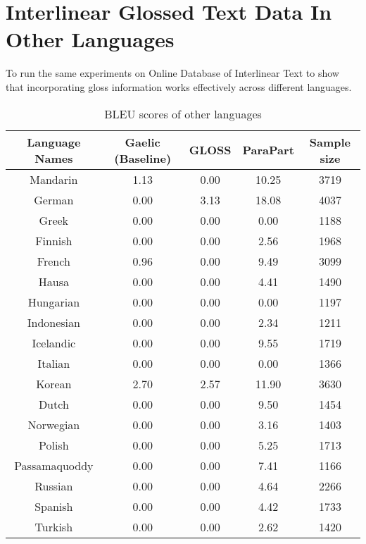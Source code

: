 \chapter{Interlinear Glossed Text Data In Other Languages}
\label{chap:gloss_in_other_languages}

To run the same experiments on Online Database of Interlinear Text \citep{ODIN, Xia2016} to show that incorporating gloss information works effectively across different languages.  

\begin{table}[ht]
\centering
\begin{tabular}{ccccc}
  \hline
Language Names & Gaelic (Baseline) & GLOSS & ParaPart & Sample size \\ 
  \hline
Mandarin & 1.13 & 0.00 & 10.25 & 3719 \\ 
  German & 0.00 & 3.13 & 18.08 & 4037 \\ 
  Greek & 0.00 & 0.00 & 0.00 & 1188 \\ 
  Finnish & 0.00 & 0.00 & 2.56 & 1968 \\ 
  French & 0.96 & 0.00 & 9.49 & 3099 \\ 
  Hausa & 0.00 & 0.00 & 4.41 & 1490 \\ 
  Hungarian & 0.00 & 0.00 & 0.00 & 1197 \\ 
  Indonesian & 0.00 & 0.00 & 2.34 & 1211 \\ 
  Icelandic & 0.00 & 0.00 & 9.55 & 1719 \\ 
  Italian & 0.00 & 0.00 & 0.00 & 1366 \\ 
  Korean & 2.70 & 2.57 & 11.90 & 3630 \\ 
  Dutch & 0.00 & 0.00 & 9.50 & 1454 \\ 
  Norwegian & 0.00 & 0.00 & 3.16 & 1403 \\ 
  Polish & 0.00 & 0.00 & 5.25 & 1713 \\ 
  Passamaquoddy & 0.00 & 0.00 & 7.41 & 1166 \\ 
  Russian & 0.00 & 0.00 & 4.64 & 2266 \\ 
  Spanish & 0.00 & 0.00 & 4.42 & 1733 \\ 
  Turkish & 0.00 & 0.00 & 2.62 & 1420 \\ 
   \hline
\end{tabular}
\caption{BLEU scores of other languages} 
\label{Table:Other_LG_BLEU}
\end{table}